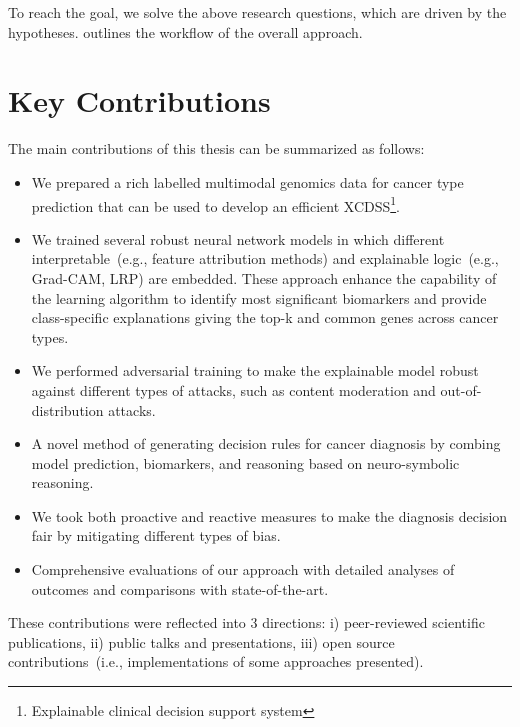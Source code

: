 \hspace*{3.5mm} To reach the goal, we solve the above research questions, which are driven by the hypotheses.  outlines the workflow of the overall approach. 

\section{Key Contributions} \label{contributions}
The main contributions of this thesis can be summarized as follows:

\begin{itemize}[noitemsep]
    \item We prepared a rich labelled multimodal genomics data for cancer type prediction that can be used to develop an efficient XCDSS\footnote{Explainable clinical decision support system}.  
    \item We trained several robust neural network models in which different interpretable~(e.g., feature attribution methods) and explainable logic~(e.g., Grad-CAM, LRP) are embedded. These approach enhance the capability of the learning algorithm to identify most significant biomarkers and provide class-specific explanations giving the top-k and common genes across cancer types. 
    \item We performed adversarial training to make the explainable model robust against different types of attacks, such as content moderation and out-of-distribution attacks. 
    \item A novel method of generating decision rules for cancer diagnosis by combing model prediction, biomarkers, and reasoning based on neuro-symbolic reasoning. 
    \item We took both proactive and reactive measures to make the diagnosis decision fair by mitigating different types of bias. 
    \item Comprehensive evaluations of our approach with detailed analyses of outcomes and comparisons with state-of-the-art. 
\end{itemize}

\hspace*{3.5mm} These contributions were reflected into 3 directions: i) peer-reviewed scientific publications, ii) public talks and presentations, iii) open source contributions~(i.e., implementations of some approaches presented). %

